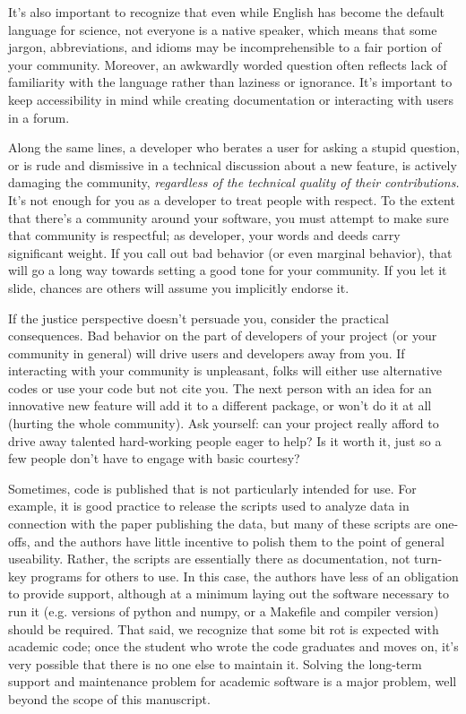 \documentclass[9pt,training,pubversion]{livecoms}
\begin{document}
It's also important to recognize that even while English has become the default
language for science, not everyone is a native speaker, which means that some
jargon, abbreviations, and idioms may be incomprehensible to a fair portion of
your community. Moreover, an awkwardly worded question often reflects lack of
familiarity with the language rather than laziness or ignorance. It's important
to keep accessibility in mind while creating documentation or interacting with
users in a forum.

Along the same lines, a developer who berates a user for asking a stupid
question, or is rude and dismissive in a technical discussion about a new
feature, is actively damaging the community, \emph{regardless of the technical
quality of their contributions.} It's not enough for you as a developer to treat
people with respect.  To the extent that there's a community around your
software, you must attempt to make sure that community is respectful; as
developer, your words and deeds carry significant weight. If you call out bad
behavior (or even marginal behavior), that will go a long way towards setting a
good tone for your community. If you let it slide, chances are others will
assume you implicitly endorse it.

If the justice perspective doesn't persuade you, consider the practical
consequences. Bad behavior on the part of developers of your project (or your
community in general) will drive users and developers away from you. If
interacting with your community is unpleasant, folks will either use alternative
codes or use your code but not cite you. The next person with an idea for an
innovative new feature will add it to a different package, or won't do it at all
(hurting the whole community). Ask yourself: can your project really afford to
drive away talented hard-working people eager to help? Is it worth it, just so a
few people don't have to engage with basic courtesy?

Sometimes, code is published that is not particularly intended for use. For
example, it is good practice to release the scripts used to analyze data in
connection with the paper publishing the data, but many of these scripts are
one-offs, and the authors have little incentive to polish them to the point of
general useability. Rather, the scripts are essentially there as documentation,
not turn-key programs for others to use. In this case, the authors have less of
an obligation to provide support, although at a minimum laying out the software
necessary to run it (e.g. versions of python and numpy, or a Makefile and
compiler version) should be required.  That said, we recognize that some bit rot
is expected with academic code; once the student who wrote the code graduates
and moves on, it's very possible that there is no one else to maintain it.
Solving the long-term support and maintenance problem for academic software is a
major problem, well beyond the scope of this manuscript.
\end{document}
